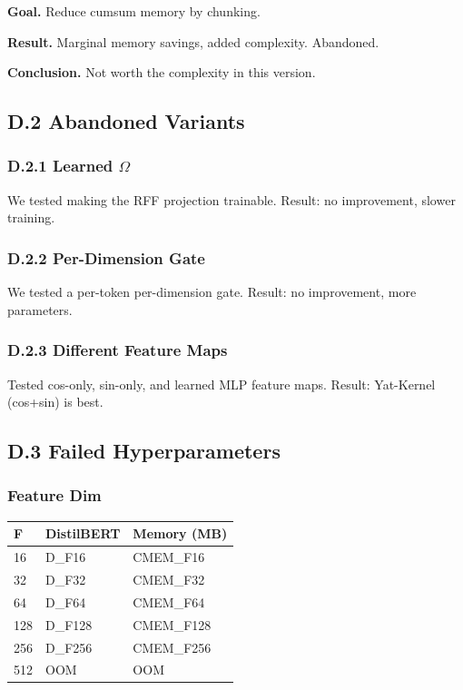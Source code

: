 \textbf{Goal.} Reduce cumsum memory by chunking.

\textbf{Result.} Marginal memory savings, added complexity. Abandoned.

\textbf{Conclusion.} Not worth the complexity in this version.

\subsection{D.2 Abandoned Variants}

\subsubsection{D.2.1 Learned $\Omega$}

We tested making the RFF projection trainable. Result: no improvement, 
slower training.

\subsubsection{D.2.2 Per-Dimension Gate}

We tested a per-token per-dimension gate. Result: no improvement, more 
parameters.

\subsubsection{D.2.3 Different Feature Maps}

Tested cos-only, sin-only, and learned MLP feature maps. Result: 
Yat-Kernel (cos+sin) is best.

\subsection{D.3 Failed Hyperparameters}

\subsubsection{Feature Dim}

\begin{table}[H]
\centering
\small
\begin{tabular}{lll}
\toprule
\textbf{F} & \textbf{DistilBERT} & \textbf{Memory (MB)} \\
\midrule
16 & {{D\_F16}} & {{CMEM\_F16}} \\
32 & {{D\_F32}} & {{CMEM\_F32}} \\
64 & {{D\_F64}} & {{CMEM\_F64}} \\
128 & {{D\_F128}} & {{CMEM\_F128}} \\
256 & {{D\_F256}} & {{CMEM\_F256}} \\
512 & OOM & OOM \\
\bottomrule
\end{tabular}
\end{table}

